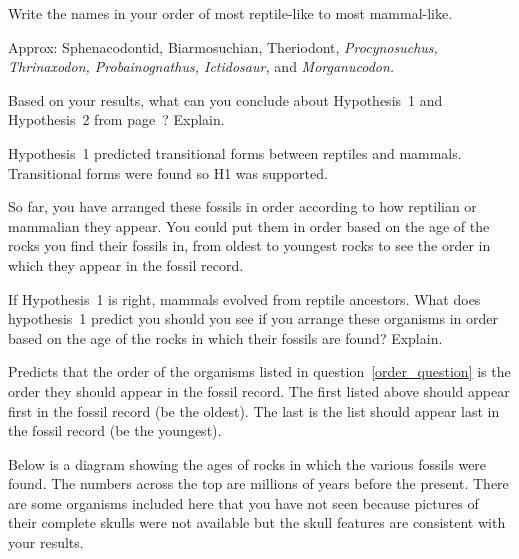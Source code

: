 \documentclass[12pt, hidelinks]{exam}
\newcommand*\AnswerBox[2]{%
    \parbox[t][#1]{0.92\textwidth}{%
    \begin{solution}#2\end{solution}}
    \vspace{\stretch{1}}
}
\begin{document}
\begin{questions}
\question \label{order_question}
Write the names in your order of most reptile-like to most mammal-like.

\AnswerBox{2\baselineskip}{Approx: Sphenacodontid, Biarmosuchian,
Theriodont, \textit{Procynosuchus, Thrinaxodon, Probainognathus, Ictidosaur,} and \textit{Morganucodon.}}

%
%
%
%
\question
Based on your results, what can you conclude about Hypothesis~1 and Hypothesis~2 from page~\pageref{hypothesis1}? Explain.

\AnswerBox{2\baselineskip}{%
Hypothesis~1 predicted transitional forms between reptiles and mammals. Transitional forms were found so H1 was supported. %
}

So far, you have arranged these fossils in order according to how reptilian or mammalian they appear. %
You could put them in order based on the age of the rocks you find their fossils in, from oldest to youngest rocks to see the order in which they appear in the fossil record. 

\question
If Hypothesis~1 is right, mammals evolved from reptile ancestors.  What does hypothesis~1 predict you should you see if you arrange these organisms in order based on the age of the rocks in which their fossils are found?  Explain.

\AnswerBox{4\baselineskip}{%
	Predicts that the order of the organisms listed in question~\ref{order_question} is the order they should appear in the fossil record. The first listed above should appear first in the fossil record (be the oldest). The last is the list should appear last in the fossil record (be the youngest). 
}

%
%
Below is a diagram showing the ages of rocks in which the various
fossils were found. The numbers across the top are millions of
years before the present. There are some organisms included here that you
have not seen because pictures of their complete skulls were not available 
but the skull features are consistent with your results.


\end{questions}
\end{document}
